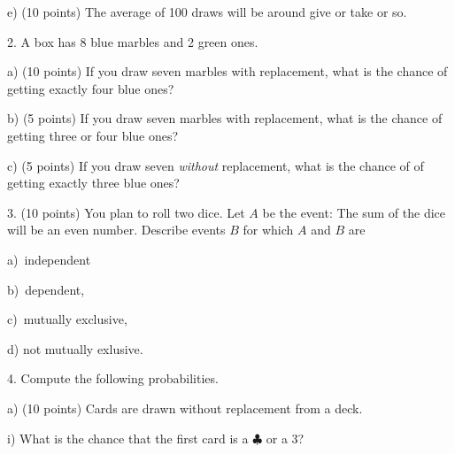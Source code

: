 \documentclass[10pt]{article}
\begin{document}
\hspace{10pt} e) (10 points) The average of 100 draws will be around \underline{\hspace{1in}} give or take
\underline{\hspace{1in}} or so.
\vspace{1.3in}


\vfill
\eject

2.  A box has 8 blue marbles and 2 green ones.  

\hspace{20pt} a) (10 points) If you draw seven marbles with replacement, what is the chance of getting 
exactly four blue ones?
\vspace{1.9in}

\hspace{10pt} b) (5 points) If you draw seven marbles with replacement, what is the chance of getting 
 three or four blue ones?
\vspace{2.3in}

\hspace{10pt} c) (5 points) If you draw seven  \textit{without} replacement, what is the chance of 
of getting  exactly three blue ones?
\vspace{1.8in}


3. (10 points) You plan to roll two dice.
Let $A$ be the event: The sum of the dice will be an even number.
Describe events $B$ for which
$A$ and $B$ are

\hspace{10pt} a)~independent
\vspace{.3in}

\hspace{10pt} b)~dependent,
\vspace{.3in}

\hspace{10pt} c)~mutually exclusive, 
\vspace{.3in}

\hspace{10pt} d) not mutually exlusive.
\vfill
\eject

4. Compute the following probabilities.

\hspace{10pt} a) (10 points) Cards are drawn without replacement from a deck.

\hspace{20pt} i) What is the chance that the first card is a $\clubsuit$ or a 3?
\vspace{.6in}
\end{document}
